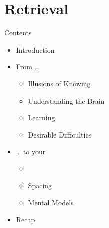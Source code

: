\documentclass{ercisbeamer}
\begin{document}
\section{Retrieval}
\begin{frame}{Contents}
    \begin{itemize}
        \item Introduction
        \item From …
        \begin{itemize}
            \item Illusions of Knowing
            \item Understanding the Brain
            \item Learning
            \item Desirable Difficulties
        \end{itemize}
        \item … to your 
        \begin{itemize}
            \item {}
            \item Spacing
            \item Mental Models
        \end{itemize}
        \item Recap
    \end{itemize}
\end{frame}
\end{document}
